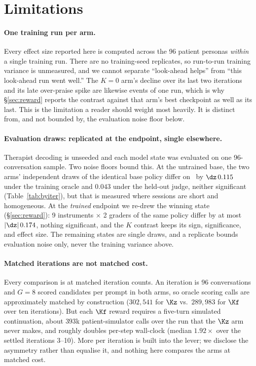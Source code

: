 \section*{Limitations}
\label{sec:limitations}

\paragraph{One training run per arm.}
Every effect size reported here is computed across the 96 patient personas \emph{within} a single
training run. There are no training-seed replicates, so run-to-run training variance is unmeasured,
and we cannot separate ``look-ahead helps'' from ``this look-ahead run went well.'' The $K{=}0$
arm's decline over its last two iterations and its late over-praise spike are likewise events of
one run, which is why \S\ref{sec:reward} reports the contrast against that arm's best checkpoint as
well as its last. This is the limitation a reader should weight most heavily. It is distinct from,
and not bounded by, the evaluation noise floor below.

\paragraph{Evaluation draws: replicated at the endpoint, single elsewhere.}
Therapist decoding is unseeded and each model state was evaluated on one 96-conversation sample.
Two noise floors bound this. At the untrained base, the two arms' independent draws of the
identical base policy differ on \QQ\ by $\dz\,0.115$ under the training oracle and $0.043$ under
the held-out judge, neither significant (Table~\ref{tab:byiter}), but that is measured where
sessions are short and homogeneous. At the \emph{trained} endpoint we re-drew the winning
state (\S\ref{sec:reward}): 9 instruments $\times$ 2 graders of the same policy differ by at most
$|\dz|\,0.174$, nothing significant, and the $K$ contrast keeps its sign, significance, and effect
size. The remaining states are single draws, and a replicate bounds evaluation noise only, never
the training variance above.

\paragraph{Matched iterations are not matched cost.}
Every comparison is at matched iteration counts. An iteration is 96 conversations and $G{=}8$
scored candidates per prompt in both arms, so oracle scoring calls are approximately matched by
construction ($302{,}541$ for $\Kz$ vs.\ $289{,}983$ for $\Kf$ over ten iterations). But each
$\Kf$ reward requires a five-turn simulated continuation, about $393$k patient-simulator calls
over the run that the $\Kz$ arm never makes, and roughly doubles per-step wall-clock (median
$1.92\times$ over the settled iterations 3--10). More per iteration is built into the lever; we
disclose the asymmetry rather than equalise it, and nothing here compares the arms at matched cost.

